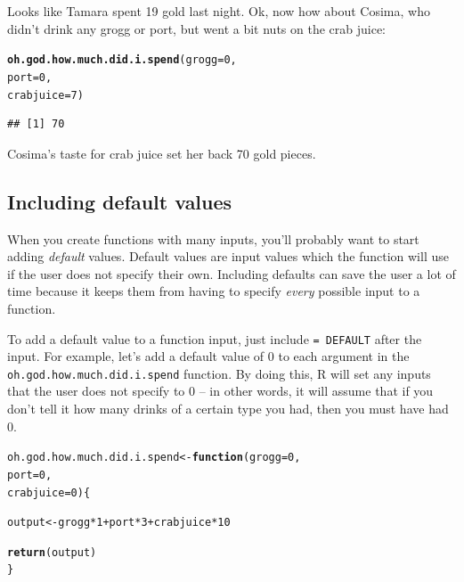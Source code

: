 \documentclass{tufte-book}\usepackage[]{graphicx}\usepackage[]{color}
\makeatletter
\newcommand{\hlnum}[1]{\textcolor[rgb]{0.686,0.059,0.569}{#1}}%
\newcommand{\hlopt}[1]{\textcolor[rgb]{0,0,0}{#1}}%
\newcommand{\hlstd}[1]{\textcolor[rgb]{0.345,0.345,0.345}{#1}}%
\newcommand{\hlkwa}[1]{\textcolor[rgb]{0.161,0.373,0.58}{\textbf{#1}}}%
\newcommand{\hlkwb}[1]{\textcolor[rgb]{0.69,0.353,0.396}{#1}}%
\newcommand{\hlkwc}[1]{\textcolor[rgb]{0.333,0.667,0.333}{#1}}%
\newcommand{\hlkwd}[1]{\textcolor[rgb]{0.737,0.353,0.396}{\textbf{#1}}}%
\newenvironment{kframe}{%
 \def\at@end@of@kframe{}%
 \ifinner\ifhmode%
  \def\at@end@of@kframe{\end{minipage}}%
  \begin{minipage}{\columnwidth}%
 \fi\fi%
 \def\FrameCommand##1{\hskip\@totalleftmargin \hskip-\fboxsep
 \colorbox{shadecolor}{##1}\hskip-\fboxsep
     \hskip-\linewidth \hskip-\@totalleftmargin \hskip\columnwidth}%
 \MakeFramed {\advance\hsize-\width
   \@totalleftmargin\z@ \linewidth\hsize
   \@setminipage}}%
 {\par\unskip\endMakeFramed%
 \at@end@of@kframe}
\newenvironment{knitrout}{}{} %
\makeatother
\begin{document}
Looks like Tamara spent 19 gold last night. Ok, now how about Cosima, who didn't drink any grogg or port, but went a bit nuts on the crab juice:

\begin{knitrout}
\color{fgcolor}\begin{kframe}
\begin{alltt}
\hlkwd{oh.god.how.much.did.i.spend}\hlstd{(}\hlkwc{grogg} \hlstd{=} \hlnum{0}\hlstd{,}
                            \hlkwc{port} \hlstd{=} \hlnum{0}\hlstd{,}
                            \hlkwc{crabjuice} \hlstd{=} \hlnum{7}\hlstd{)}
\end{alltt}
\begin{verbatim}
## [1] 70
\end{verbatim}
\end{kframe}
\end{knitrout}

Cosima's taste for crab juice set her back 70 gold pieces.

\subsection{Including default values}

When you create functions with many inputs, you'll probably want to start adding \textit{default} values. Default values are input values which the function will use if the user does not specify their own. Including defaults can save the user a lot of time because it keeps them from having to specify \textit{every} possible input to a function.

To add a default value to a function input, just include \texttt{= DEFAULT} after the input. For example, let's add a default value of 0 to each argument in the \texttt{oh.god.how.much.did.i.spend} function. By doing this, R will set any inputs that the user does not specify to 0 -- in other words, it will assume that if you don't tell it how many drinks of a certain type you had, then you must have had 0.

\begin{knitrout}
\color{fgcolor}\begin{kframe}
\begin{alltt}
\hlstd{oh.god.how.much.did.i.spend} \hlkwb{<-} \hlkwa{function}\hlstd{(}\hlkwc{grogg} \hlstd{=} \hlnum{0}\hlstd{,}
                                        \hlkwc{port} \hlstd{=} \hlnum{0}\hlstd{,}
                                        \hlkwc{crabjuice} \hlstd{=} \hlnum{0}\hlstd{) \{}

  \hlstd{output} \hlkwb{<-} \hlstd{grogg} \hlopt{*} \hlnum{1} \hlopt{+} \hlstd{port} \hlopt{*} \hlnum{3} \hlopt{+} \hlstd{crabjuice} \hlopt{*} \hlnum{10}

  \hlkwd{return}\hlstd{(output)}
\hlstd{\}}
\end{alltt}
\end{kframe}
\end{knitrout}
\end{document}
